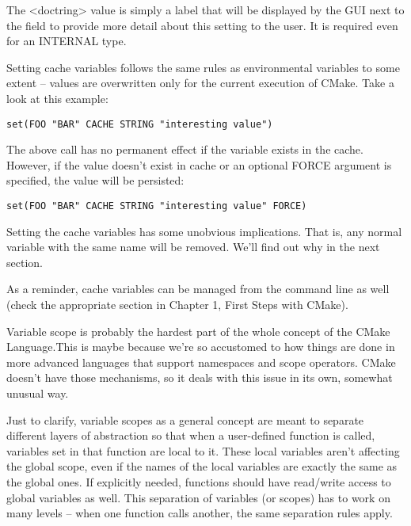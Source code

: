 The <doctring> value is simply a label that will be displayed by the GUI next to the field to provide more detail about this setting to the user. It is required even for an INTERNAL type.

Setting cache variables follows the same rules as environmental variables to some extent – values are overwritten only for the current execution of CMake. Take a look at this example:

\begin{lstlisting}[style=styleCMake]
set(FOO "BAR" CACHE STRING "interesting value")
\end{lstlisting}

The above call has no permanent effect if the variable exists in the cache. However, if the value doesn't exist in cache or an optional FORCE argument is specified, the value will be persisted:

\begin{lstlisting}[style=styleCMake]
set(FOO "BAR" CACHE STRING "interesting value" FORCE)
\end{lstlisting}

Setting the cache variables has some unobvious implications. That is, any normal variable with the same name will be removed. We'll find out why in the next section.

As a reminder, cache variables can be managed from the command line as well (check the appropriate section in Chapter 1, First Steps with CMake).


Variable scope is probably the hardest part of the whole concept of the CMake Language.This is maybe because we're so accustomed to how things are done in more advanced languages that support namespaces and scope operators. CMake doesn't have those mechanisms, so it deals with this issue in its own, somewhat unusual way.

Just to clarify, variable scopes as a general concept are meant to separate different layers of abstraction so that when a user-defined function is called, variables set in that function are local to it. These local variables aren't affecting the global scope, even if the names of the local variables are exactly the same as the global ones. If explicitly needed, functions should have read/write access to global variables as well. This separation of variables (or scopes) has to work on many levels – when one function calls another, the same separation rules apply.

